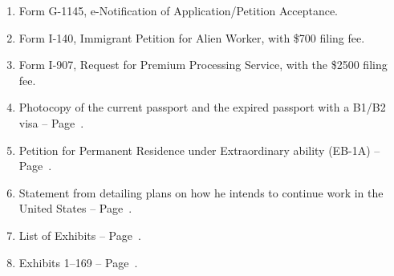 
\begin{enumerate}
    \item Form G-1145, e-Notification of Application/Petition Acceptance.
    \item Form I-140, Immigrant Petition for Alien Worker, with \$700 filing fee.
    \item Form I-907, Request for Premium Processing Service, with the \$2500 filing fee.
    \item Photocopy of the current passport and the expired passport with a B1/B2 visa -- Page~\pageref{Passport}.
    \item Petition for Permanent Residence under Extraordinary ability (EB-1A) -- Page~\pageref{Body}.
    \item Statement from \mrl detailing plans on how he intends to continue work in the United States -- Page~\pageref{WorkPlan}.
    \item List of Exhibits -- Page~\pageref{ListOfExhibits}.
    \item Exhibits 1--169 -- Page~\pageref{Exhibits}. %
\end{enumerate}

\pagebreak
